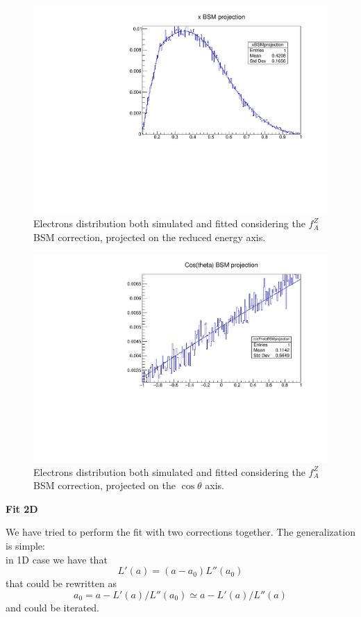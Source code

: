\begin{figure} [htp]
\centering
\includegraphics[scale=0.7]{03_364x.pdf}
\caption{Electrons distribution both simulated and fitted considering the $f_A^Z$ BSM correction, projected on the reduced energy axis.}
\label{03_364x}
\end{figure}

\begin{figure} [htp]
\centering
\includegraphics[scale=0.7]{03_364cosTheta.pdf}
\caption{Electrons distribution both simulated and fitted considering the $f_A^Z$ BSM correction, projected on the $\cos\theta$ axis.}
\label{03_364cosTheta}
\end{figure}

\textbf{Fit 2D}

We have tried to perform the fit with two corrections together. The generalization is simple: \\
in 1D case we have that 
\[ L'(a)=(a-a_0)L''(a_0)\]
that could be rewritten as \[a_0=a- L'(a)/L''(a_0) \simeq a- L'(a)/L''(a) \]
and could be iterated.

